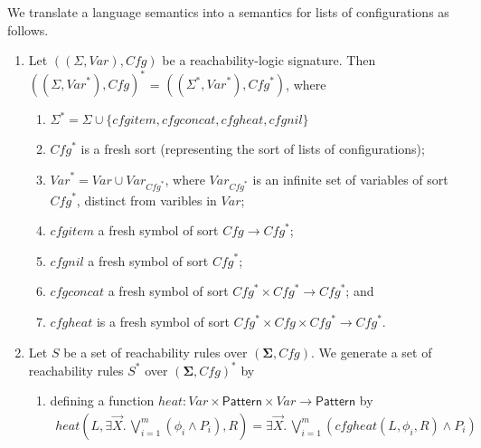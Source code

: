 \documentclass{article}
\newcommand{\Pattern}{\mathsf{Pattern}}
\begin{document}
\begin{definition}\label{def:starextension}
We translate a language semantics into a semantics for lists of configurations as follows.
\begin{enumerate}
    \item Let $((\Sigma, \mathit{Var}), \mathit{Cfg})$ be a reachability-logic signature.
          Then $((\Sigma, \mathit{Var}^*), \mathit{Cfg})^*$ = $((\Sigma^*, \mathit{Var}^*), \mathit{Cfg}^*)$,
          where
          \begin{enumerate}
              \item $\Sigma^* = \Sigma \cup \{ \mathit{cfgitem}, \mathit{cfgconcat}, \mathit{cfgheat}, \mathit{cfgnil} \}$
              \item $\mathit{Cfg}^*$ is a fresh sort (representing the sort of lists of configurations);
              \item $\mathit{Var}^* = \mathit{Var} \cup \mathit{Var}_{\mathit{Cfg}^*}$,
              where $\mathit{Var}_{\mathit{Cfg}^*}$ is an infinite set of variables of sort $\mathit{Cfg}^*$,
              distinct from varibles in $\mathit{Var}$;
              \item $\mathit{cfgitem}$ a fresh symbol of sort $\mathit{Cfg} \to \mathit{Cfg}^*$;
              \item $\mathit{cfgnil}$ a fresh symbol of sort $\mathit{Cfg}^*$;
              \item $\mathit{cfgconcat}$ a fresh symbol of sort $\mathit{Cfg}^* \times \mathit{Cfg}^* \to \mathit{Cfg}^*$; and
              \item $\mathit{cfgheat}$ is a fresh symbol of sort $\mathit{Cfg}^* \times \mathit{Cfg} \times \mathit{Cfg}^* \to \mathit{Cfg}^*$.
          \end{enumerate}
    \item Let $S$ be a set of reachability rules over $(\mathbf{\Sigma}, \mathit{Cfg})$.
          We generate a set of reachability rules $S^*$ over $(\mathbf{\Sigma}, \mathit{Cfg})^*$
          by
          \begin{enumerate}
              \item defining a function $\mathit{heat} : \mathit{Var} \times \Pattern \times \mathit{Var} \to \Pattern$ by
              \begin{align*}
                  \mathit{heat}(L, \exists \vec{X}.\, \bigvee_{i=1}^{m} (\phi_i \land P_i), R)
                  = \exists \vec{X}.\, \bigvee_{i=1}^{m} ( \mathit{cfgheat(L, \phi_i, R)} \land P_i)
              \end{align*}

\end{enumerate}
\end{enumerate}
\end{definition}
\end{document}

